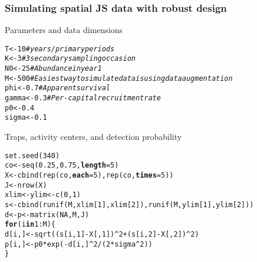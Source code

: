\documentclass[color=usenames,dvipsnames]{beamer}\usepackage[]{graphicx}\usepackage[]{color}
\makeatletter
\newcommand{\hlnum}[1]{\textcolor[rgb]{0.69,0.494,0}{#1}}%
\newcommand{\hlcom}[1]{\textcolor[rgb]{0.514,0.506,0.514}{\textit{#1}}}%
\newcommand{\hlopt}[1]{\textcolor[rgb]{0,0,0}{#1}}%
\newcommand{\hlstd}[1]{\textcolor[rgb]{0,0,0}{#1}}%
\newcommand{\hlkwa}[1]{\textcolor[rgb]{0,0,0}{\textbf{#1}}}%
\newcommand{\hlkwb}[1]{\textcolor[rgb]{0,0.341,0.682}{#1}}%
\newcommand{\hlkwc}[1]{\textcolor[rgb]{0,0,0}{\textbf{#1}}}%
\newcommand{\hlkwd}[1]{\textcolor[rgb]{0.004,0.004,0.506}{#1}}%
\newenvironment{kframe}{%
 \def\at@end@of@kframe{}%
 \ifinner\ifhmode%
  \def\at@end@of@kframe{\end{minipage}}%
  \begin{minipage}{\columnwidth}%
 \fi\fi%
 \def\FrameCommand##1{\hskip\@totalleftmargin \hskip-\fboxsep
 \colorbox{shadecolor}{##1}\hskip-\fboxsep
     \hskip-\linewidth \hskip-\@totalleftmargin \hskip\columnwidth}%
 \MakeFramed {\advance\hsize-\width
   \@totalleftmargin\z@ \linewidth\hsize
   \@setminipage}}%
 {\par\unskip\endMakeFramed%
 \at@end@of@kframe}
\newenvironment{knitrout}{}{} %
\makeatother
\begin{document}
\begin{frame}[fragile]
  \frametitle{Simulating spatial JS data with robust design}
  {Parameters and data dimensions}
\begin{knitrout}\scriptsize
{}\color{fgcolor}\begin{kframe}
\begin{alltt}
\hlstd{T} \hlkwb{<-} \hlnum{10}      \hlcom{# years/primary periods}
\hlstd{K} \hlkwb{<-} \hlnum{3}       \hlcom{# 3 secondary sampling occasion}
\hlstd{N0} \hlkwb{<-} \hlnum{25}     \hlcom{# Abundance in year 1}
\hlstd{M} \hlkwb{<-} \hlnum{500}     \hlcom{# Easiest way to simulate data is using data augmentation}
\hlstd{phi} \hlkwb{<-} \hlnum{0.7}   \hlcom{# Apparent survival}
\hlstd{gamma} \hlkwb{<-} \hlnum{0.3} \hlcom{# Per-capital recruitment rate}
\hlstd{p0} \hlkwb{<-} \hlnum{0.4}
\hlstd{sigma} \hlkwb{<-} \hlnum{0.1}
\end{alltt}
\end{kframe}
\end{knitrout}
\pause
{Traps, activity centers, and detection probability}
\begin{knitrout}\scriptsize
{}\color{fgcolor}\begin{kframe}
\begin{alltt}
\hlkwd{set.seed}\hlstd{(}\hlnum{340}\hlstd{)}
\hlstd{co} \hlkwb{<-} \hlkwd{seq}\hlstd{(}\hlnum{0.25}\hlstd{,} \hlnum{0.75}\hlstd{,} \hlkwc{length}\hlstd{=}\hlnum{5}\hlstd{)}
\hlstd{X} \hlkwb{<-} \hlkwd{cbind}\hlstd{(}\hlkwd{rep}\hlstd{(co,} \hlkwc{each}\hlstd{=}\hlnum{5}\hlstd{),} \hlkwd{rep}\hlstd{(co,} \hlkwc{times}\hlstd{=}\hlnum{5}\hlstd{))}
\hlstd{J} \hlkwb{<-} \hlkwd{nrow}\hlstd{(X)}
\hlstd{xlim} \hlkwb{<-} \hlstd{ylim} \hlkwb{<-} \hlkwd{c}\hlstd{(}\hlnum{0}\hlstd{,}\hlnum{1}\hlstd{)}
\hlstd{s} \hlkwb{<-} \hlkwd{cbind}\hlstd{(}\hlkwd{runif}\hlstd{(M, xlim[}\hlnum{1}\hlstd{], xlim[}\hlnum{2}\hlstd{]),} \hlkwd{runif}\hlstd{(M, ylim[}\hlnum{1}\hlstd{], ylim[}\hlnum{2}\hlstd{]))}
\hlstd{d} \hlkwb{<-} \hlstd{p} \hlkwb{<-} \hlkwd{matrix}\hlstd{(}\hlnum{NA}\hlstd{, M, J)}
\hlkwa{for}\hlstd{(i} \hlkwa{in} \hlnum{1}\hlopt{:}\hlstd{M) \{}
    \hlstd{d[i,]} \hlkwb{<-} \hlkwd{sqrt}\hlstd{((s[i,}\hlnum{1}\hlstd{]}\hlopt{-}\hlstd{X[,}\hlnum{1}\hlstd{])}\hlopt{^}\hlnum{2} \hlopt{+} \hlstd{(s[i,}\hlnum{2}\hlstd{]}\hlopt{-}\hlstd{X[,}\hlnum{2}\hlstd{])}\hlopt{^}\hlnum{2}\hlstd{)}
    \hlstd{p[i,]} \hlkwb{<-} \hlstd{p0}\hlopt{*}\hlkwd{exp}\hlstd{(}\hlopt{-}\hlstd{d[i,]}\hlopt{^}\hlnum{2}\hlopt{/}\hlstd{(}\hlnum{2}\hlopt{*}\hlstd{sigma}\hlopt{^}\hlnum{2}\hlstd{))}
\hlstd{\}}
\end{alltt}
\end{kframe}
\end{knitrout}
\end{frame}
\end{document}
